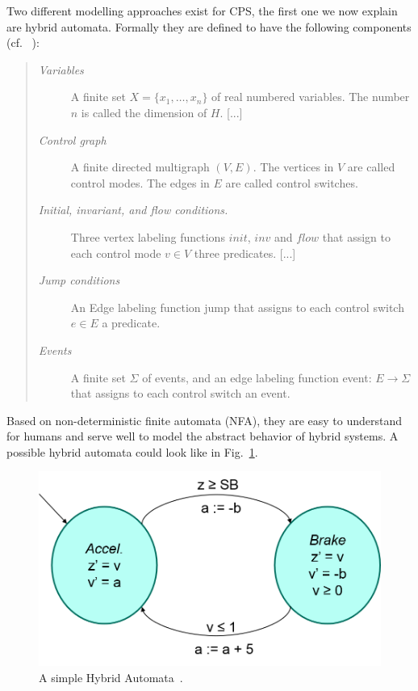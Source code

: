 Two different modelling approaches exist for CPS, the first one we now explain are hybrid automata. Formally they are defined to have the following components (cf. ~\cite{Heinzinger2000b}):
\begin{quote}
		\begin{description}
			\item[\textit{Variables}]A finite set \(X = \{x_1,\dots , x_n\}\) of real numbered variables. The number \(n\) is called the dimension of \(H\). [...]
			\item[\textit{Control graph}]A finite directed multigraph \((V, E)\). The vertices in \(V\) are called control modes. The edges in \(E\) are called control switches.
			\item[\textit{Initial, invariant, and flow conditions.}]Three vertex labeling functions \(init\), \(inv\) and \(flow\) that assign to each control mode \(v\in V\) three predicates. [...]
			\item[\textit{Jump conditions}]An Edge labeling function jump that assigns to each control switch  \(e \in E\) a predicate.
			\item[\textit{Events}]A finite set \(\Sigma\) of events, and an edge labeling function event: \(E \rightarrow \Sigma\) that assigns to each control switch an event.
		\end{description}
\end{quote} 

Based on non-deterministic finite automata (NFA), they are easy to understand for humans and serve well to model the abstract behavior of hybrid systems. A possible hybrid automata could look like in Fig.~\ref{fig:automata}.

\begin{figure}[ht!]
	\centering
	\includegraphics[width=1.0\textwidth]{images/automata}
	\caption{A simple Hybrid Automata~\cite{platze2010b}.}
	\label{fig:automata}
\end{figure}

